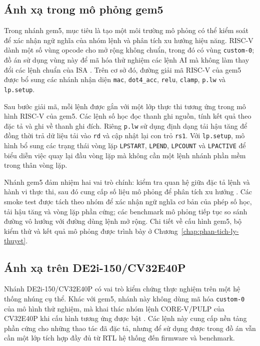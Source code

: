 \documentclass[../DoAn.tex]{subfiles}
\begin{document}
\subsection{Ánh xạ trong mô phỏng gem5}
\label{subsec:anh-xa-gem5}

Trong nhánh gem5, mục tiêu là tạo một môi trường mô phỏng có thể kiểm soát để xác nhận ngữ nghĩa của nhóm lệnh và phân tích xu hướng hiệu năng. RISC-V dành một số vùng opcode cho mở rộng không chuẩn, trong đó có vùng \texttt{custom-0}; đồ án sử dụng vùng này để mã hóa thử nghiệm các lệnh AI mà không làm thay đổi các lệnh chuẩn của ISA \cite{riscv_unpriv_2026}. Trên cơ sở đó, đường giải mã RISC-V của gem5 được bổ sung các nhánh nhận diện \texttt{mac}, \texttt{dot4\_acc}, \texttt{relu}, \texttt{clamp}, \texttt{p.lw} và \texttt{lp.setup}.

Sau bước giải mã, mỗi lệnh được gắn với một lớp thực thi tương ứng trong mô hình RISC-V của gem5. Các lệnh số học đọc thanh ghi nguồn, tính kết quả theo đặc tả và ghi về thanh ghi đích. Riêng \texttt{p.lw} sử dụng định dạng tải hậu tăng để đồng thời trả dữ liệu tải vào \texttt{rd} và cập nhật lại con trỏ \texttt{rs1}. Với \texttt{lp.setup}, mô hình bổ sung các trạng thái vòng lặp \texttt{LPSTART}, \texttt{LPEND}, \texttt{LPCOUNT} và \texttt{LPACTIVE} để biểu diễn việc quay lại đầu vòng lặp mà không cần một lệnh nhánh phần mềm trong thân vòng lặp.

Nhánh gem5 đảm nhiệm hai vai trò chính: kiểm tra quan hệ giữa đặc tả lệnh và hành vi thực thi, sau đó cung cấp số liệu mô phỏng để phân tích xu hướng \cite{binkert2011gem5,gem5_docs_2026}. Các smoke test được tách theo nhóm để xác nhận ngữ nghĩa cơ bản của phép số học, tải hậu tăng và vòng lặp phần cứng; các benchmark mô phỏng tiếp tục so sánh đường vô hướng với đường dùng lệnh mở rộng. Chi tiết về cấu hình gem5, bộ kiểm thử và kết quả mô phỏng được trình bày ở Chương~\ref{chap:phan-tich-ly-thuyet}.

\subsection{Ánh xạ trên DE2i-150/CV32E40P}
\label{subsec:anh-xa-de2i150-cv32e40p}

Nhánh DE2i-150/CV32E40P có vai trò kiểm chứng thực nghiệm trên một hệ thống nhúng cụ thể. Khác với gem5, nhánh này không dùng mã hóa \texttt{custom-0} của mô hình thử nghiệm, mà khai thác nhóm lệnh CORE-V/PULP của CV32E40P khi cấu hình tương ứng được bật \cite{openhw_cv32e40p_um_2024}. Các lệnh này cung cấp nền tảng phần cứng cho những thao tác đã đặc tả, nhưng để sử dụng được trong đồ án vẫn cần một lớp tích hợp đầy đủ từ RTL hệ thống đến firmware và benchmark.
\end{document}
